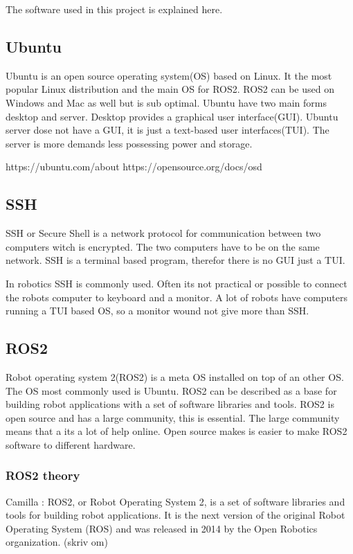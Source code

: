 The software used in this project is explained here. 

\subsection{Ubuntu}

Ubuntu is an open source operating system(OS) based on Linux. It the most popular Linux distribution and the main OS for ROS2. ROS2 can be used on Windows and Mac as well but is sub optimal. Ubuntu have two main forms desktop and server. Desktop provides a graphical user interface(GUI). Ubuntu server dose not have a GUI, it is just a text-based user interfaces(TUI). The server is more demands less possessing power and storage. 

https://ubuntu.com/about
https://opensource.org/docs/osd 

\subsection{SSH}

SSH or Secure Shell is a network protocol for communication between two computers witch is encrypted. The two computers have to be on the same network. SSH is a terminal based program, therefor there is no GUI just a TUI. 

In robotics SSH is commonly used. Often its not practical or possible to connect the robots computer to keyboard and a monitor. A lot of robots have computers running a TUI based OS, so a monitor wound not give more than SSH. 

\subsection{ROS2}

Robot operating system 2(ROS2) is a meta OS installed on top of an other OS. The OS most commonly used is Ubuntu. ROS2 can be described as a base for building robot applications with a set of software libraries and tools. ROS2 is open source and has a large community, this is essential. The large community means that a its a lot of help online. Open source makes is easier to make ROS2 software to different hardware. 

\subsubsection{ROS2 theory}
Camilla : 
ROS2, or Robot Operating System 2, is a set of software libraries and tools for building robot applications. It is the next version of the original Robot Operating System (ROS) and was released in 2014 by the Open Robotics organization. (skriv om)

